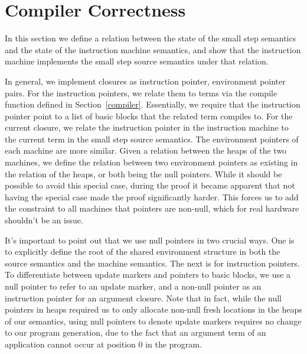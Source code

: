 \section{Compiler Correctness} 

In this section we define a relation between the state of the small step
semantics and the state of the instruction machine semantics, and show that the
instruction machine implements the small step source semantics under that
relation. 

In general, we implement closures as instruction pointer, environment pointer
pairs. For the instruction pointers, we relate them to terms via the compile
function defined in Section~\ref{compiler}. Essentially, we require that the
instruction pointer point to a list of basic blocks that the related term
compiles to. For the current closure, we relate the instruction pointer in the
instruction machine to the current term in the small step source semantics. The
environment pointers of each machine are more similar. Given a relation between
the heaps of the two machines, we define the relation between two environment
pointers as existing in the relation of the heaps, or both being the null
pointers. While it should be possible to avoid this special case, during the
proof it became apparent that not having the special case made the proof
significantly harder. This forces us to add the constraint to all machines that
pointers are non-null, which for real hardware shouldn't be an issue.  

It's important to point out that we use null pointers in two crucial ways. One
is to explicitly define the root of the shared environment structure in both the
source semantics and the machine semantics. The next is for instruction
pointers. To differentiate between update markers and pointers to basic blocks,
we use a null pointer to refer to an update marker, and a non-null pointer as an
instruction pointer for an argument closure. Note that in fact, while the null
pointers in heaps required us to only allocate non-null fresh locations in the
heaps of our semantics, using null pointers to denote update markers requires no
change to our program generation, due to the fact that an argument term of an
application cannot occur at position 0 in the program.

